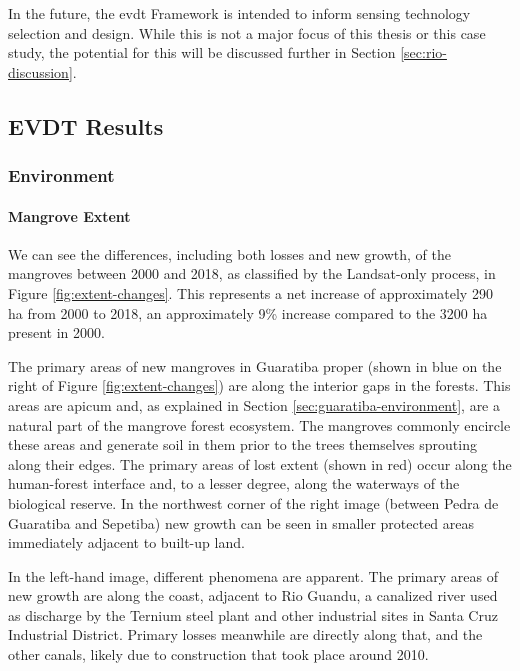 In the future, the \ac{evdt} Framework is intended to inform sensing technology selection and design. While this is not a major focus of this thesis or this case study, the potential for this will be discussed further in Section \ref{sec:rio-discussion}.

\subsection{EVDT Results} \label{sec:rio-evdt-result}

\subsubsection{Environment} \label{sec:rio-evdt-e-result}

\paragraph{Mangrove Extent} \leavevmode\newline

We can see the differences, including both losses and new growth, of the mangroves between 2000 and 2018, as classified by the Landsat-only process, in Figure \ref{fig:extent-changes}. This represents a net increase of approximately 290 ha from 2000 to 2018, an approximately 9\% increase compared to the 3200 ha present in 2000.

The primary areas of new mangroves in Guaratiba proper (shown in blue on the right of Figure \ref{fig:extent-changes}) are along the interior gaps in the forests. This areas are apicum and, as explained in Section \ref{sec:guaratiba-environment}, are a natural part of the mangrove forest ecosystem. The mangroves commonly encircle these areas and generate soil in them prior to the trees themselves sprouting along their edges. The primary areas of lost extent (shown in red) occur along the human-forest interface and, to a lesser degree, along the waterways of the biological reserve. In the northwest corner of the right image (between Pedra de Guaratiba and Sepetiba) new growth can be seen in smaller protected areas immediately adjacent to built-up land.

In the left-hand image, different phenomena are apparent. The primary areas of new growth are along the coast, adjacent to Rio Guandu, a canalized river used as discharge by the Ternium steel plant and other industrial sites in Santa Cruz Industrial District. Primary losses meanwhile are directly along that, and the other canals, likely due to construction that took place around 2010. 
	

